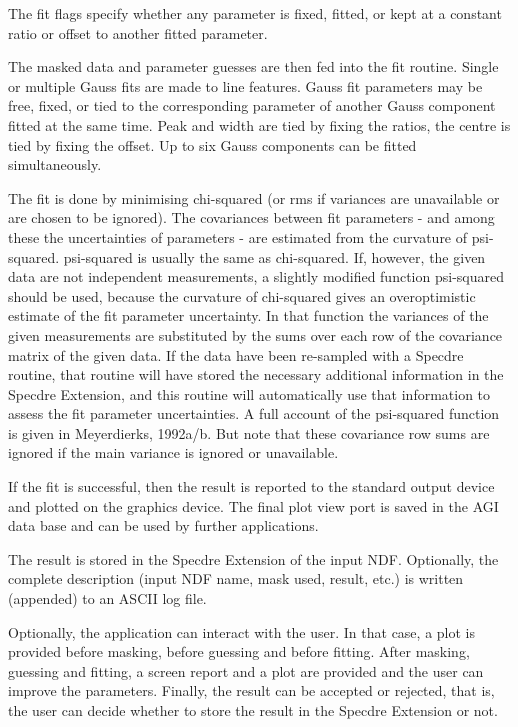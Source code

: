 \begin{description}
\begin{description}
\begin{terminalv}
   The fit flags specify whether any parameter is fixed, fitted, or
   kept at a constant ratio or offset to another fitted parameter.

   The masked data and parameter guesses are then fed into the fit
   routine. Single or multiple Gauss fits are made to line features.
   Gauss fit parameters may be free, fixed, or tied to the
   corresponding parameter of another Gauss component fitted at the
   same time. Peak and width are tied by fixing the ratios, the
   centre is tied by fixing the offset. Up to six Gauss components
   can be fitted simultaneously.

   The fit is done by minimising chi-squared (or rms if variances are
   unavailable or are chosen to be ignored). The covariances between
   fit parameters - and among these the uncertainties of parameters -
   are estimated from the curvature of psi-squared. psi-squared is
   usually the same as chi-squared. If, however, the given data are
   not independent measurements, a slightly modified function
   psi-squared should be used, because the curvature of chi-squared
   gives an overoptimistic estimate of the fit parameter uncertainty.
   In that function the variances of the given measurements are
   substituted by the sums over each row of the covariance matrix of
   the given data. If the data have been re-sampled with a Specdre
   routine, that routine will have stored the necessary additional
   information in the Specdre Extension, and this routine will
   automatically use that information to assess the fit parameter
   uncertainties. A full account of the psi-squared function is given
   in Meyerdierks, 1992a/b. But note that these covariance row sums
   are ignored if the main variance is ignored or unavailable.

   If the fit is successful, then the result is reported to
   the standard output device and plotted on the graphics device. The
   final plot view port is saved in the AGI data base and can be used
   by further applications.

   The result is stored in the Specdre Extension of the input NDF.
   Optionally, the complete description (input NDF name, mask used,
   result, etc.) is written (appended) to an ASCII log file.

   Optionally, the application can interact with the user. In that
   case, a plot is provided before masking, before guessing and
   before fitting. After masking, guessing and fitting, a screen
   report and a plot are provided and the user can improve the
   parameters. Finally, the result can be accepted or rejected, that
   is, the user can decide whether to store the result in the Specdre
   Extension or not.


\end{terminalv}
\end{description}
\end{description}
